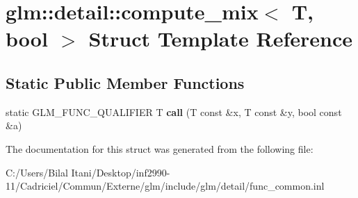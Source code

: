 \hypertarget{structglm_1_1detail_1_1compute__mix_3_01_t_00_01bool_01_4}{}\section{glm\+:\+:detail\+:\+:compute\+\_\+mix$<$ T, bool $>$ Struct Template Reference}
\label{structglm_1_1detail_1_1compute__mix_3_01_t_00_01bool_01_4}
\subsection*{Static Public Member Functions}
\begin{DoxyCompactItemize}
\item 
static G\+L\+M\+\_\+\+F\+U\+N\+C\+\_\+\+Q\+U\+A\+L\+I\+F\+I\+ER T {\bfseries call} (T const \&x, T const \&y, bool const \&a)\hypertarget{structglm_1_1detail_1_1compute__mix_3_01_t_00_01bool_01_4_a7a83cf7bd102239b974faf18137d8c63}{}\label{structglm_1_1detail_1_1compute__mix_3_01_t_00_01bool_01_4_a7a83cf7bd102239b974faf18137d8c63}

\end{DoxyCompactItemize}


The documentation for this struct was generated from the following file\+:\begin{DoxyCompactItemize}
\item 
C\+:/\+Users/\+Bilal Itani/\+Desktop/inf2990-\/11/\+Cadriciel/\+Commun/\+Externe/glm/include/glm/detail/func\+\_\+common.\+inl\end{DoxyCompactItemize}
